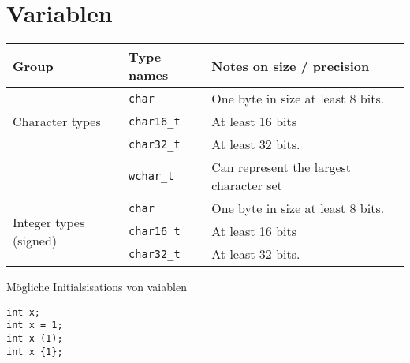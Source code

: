 \section{Variablen}

\begin{center}
	\begin{tabular}{ |l|l|l|l| } 
		\hline
		\textbf{Group} & \textbf{Type names} & \textbf{Notes on size / precision} \\
		\hline
		\multirow{3}{4em}{Character types} 
		& \texttt{char} & One byte in size at least 8 bits. \\ 
		& \texttt{char16\_t} & At least 16 bits \\ 
		& \texttt{char32\_t} & At least 32 bits. \\ 
		& \texttt{wchar\_t} & Can represent the largest character set \\ 
		\hline
		
		\multirow{3}{4em}{Integer types (signed)} 
		& \texttt{char} & One byte in size at least 8 bits. \\ 
		& \texttt{char16\_t} & At least 16 bits \\ 
		& \texttt{char32\_t} & At least 32 bits. \\ 
		\hline
	\end{tabular}
\end{center}
Mögliche Initialsisations von vaiablen
\begin{lstlisting}	
int x;
int x = 1;
int x (1);
int x {1};
\end{lstlisting}